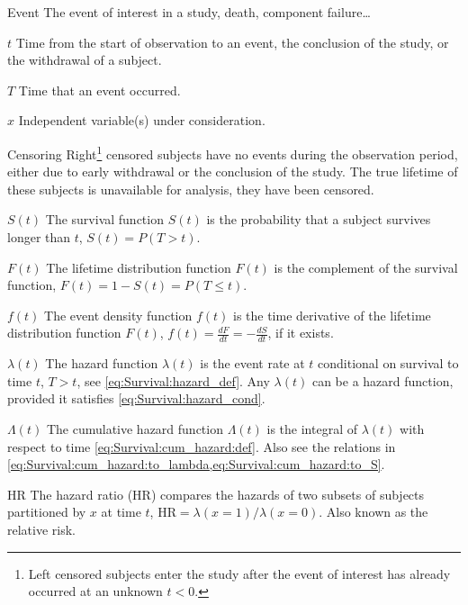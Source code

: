 \begin{symbollist}
	\item[Event] The event of interest in a study, \eg death, component failure\ldots
	\item[$t$] Time from the start of observation to an event, the conclusion of the study, or the withdrawal of a subject.
	\item[$T$] Time that an event occurred.
	\item[$x$] Independent variable(s) under consideration.
	\item[Censoring] Right\footnote{Left censored subjects enter the study after the event of interest has already occurred at an unknown $t < 0$.} censored subjects have no events during the observation period, either due to early withdrawal or the conclusion of the study. The true lifetime of these subjects is unavailable for analysis, \ie they have been censored.
	\item[$S\left(t\right)$] The survival function $S\left(t\right)$ is the probability that a subject survives longer than $t$, \ie $S\left(t\right) = P\left(T > t\right)$.
	\item[$F\left(t\right)$] The lifetime distribution function $F\left(t\right)$ is the complement of the survival function, \ie $F\left(t\right) = 1 - S\left(t\right) = P\left(T \leq t\right)$.
	\item[$f\left(t\right)$] The event density function $f\left(t\right)$ is the time derivative of the lifetime distribution function $F\left(t\right)$, $f\left(t\right) = \frac{dF}{dt} = -\frac{dS}{dt}$, if it exists.
	\item[$\lambda\left(t\right)$] The hazard function $\lambda\left(t\right)$ is the event rate at $t$ conditional on survival to time $t$, \ie $T > t$, see \cref{eq:Survival:hazard_def}. Any $\lambda\left(t\right)$ can be a hazard function, provided it satisfies \cref{eq:Survival:hazard_cond}.
	\item[$\Lambda\left(t\right)$] The cumulative hazard function $\Lambda\left(t\right)$ is the integral of $\lambda\left(t\right)$ with respect to time \cref{eq:Survival:cum_hazard:def}. Also see the relations in \cref{eq:Survival:cum_hazard:to_lambda,eq:Survival:cum_hazard:to_S}.
	\item[HR] The hazard ratio (HR) compares the hazards of two subsets of subjects partitioned by $x$ at time $t$, $\text{HR} = \lambda\left(x = 1\right) / \lambda\left(x=0\right)$. Also known as the relative risk.
\end{symbollist}

